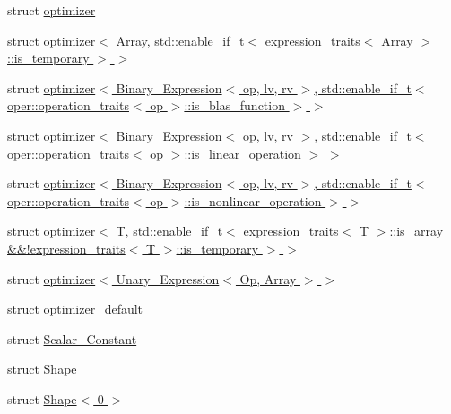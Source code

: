 \begin{DoxyCompactItemize}
\item 
struct \hyperlink{structBC_1_1tensors_1_1exprs_1_1optimizer}{optimizer}
\item 
struct \hyperlink{structBC_1_1tensors_1_1exprs_1_1optimizer_3_01Array_00_01std_1_1enable__if__t_3_01expression__tr68cef5038e1d1eb9ba9ce04475b4c24a}{optimizer$<$ Array, std\+::enable\+\_\+if\+\_\+t$<$ expression\+\_\+traits$<$ Array $>$\+::is\+\_\+temporary $>$ $>$}
\item 
struct \hyperlink{structBC_1_1tensors_1_1exprs_1_1optimizer_3_01Binary__Expression_3_01op_00_01lv_00_01rv_01_4_00_183e68db6823926ca0c2e82552c93f0f}{optimizer$<$ Binary\+\_\+\+Expression$<$ op, lv, rv $>$, std\+::enable\+\_\+if\+\_\+t$<$ oper\+::operation\+\_\+traits$<$ op $>$\+::is\+\_\+blas\+\_\+function $>$ $>$}
\item 
struct \hyperlink{structBC_1_1tensors_1_1exprs_1_1optimizer_3_01Binary__Expression_3_01op_00_01lv_00_01rv_01_4_00_f6303e0a787eb8566b71e5cc034a3dd8}{optimizer$<$ Binary\+\_\+\+Expression$<$ op, lv, rv $>$, std\+::enable\+\_\+if\+\_\+t$<$ oper\+::operation\+\_\+traits$<$ op $>$\+::is\+\_\+linear\+\_\+operation $>$ $>$}
\item 
struct \hyperlink{structBC_1_1tensors_1_1exprs_1_1optimizer_3_01Binary__Expression_3_01op_00_01lv_00_01rv_01_4_00_11116ffe640829700a69ab4f1bad216e}{optimizer$<$ Binary\+\_\+\+Expression$<$ op, lv, rv $>$, std\+::enable\+\_\+if\+\_\+t$<$ oper\+::operation\+\_\+traits$<$ op $>$\+::is\+\_\+nonlinear\+\_\+operation $>$ $>$}
\item 
struct \hyperlink{structBC_1_1tensors_1_1exprs_1_1optimizer_3_01T_00_01std_1_1enable__if__t_3_01expression__traitsf1cfe5fcb8a0bc73842726d99ded0fc2}{optimizer$<$ T, std\+::enable\+\_\+if\+\_\+t$<$ expression\+\_\+traits$<$ T $>$\+::is\+\_\+array \&\&!expression\+\_\+traits$<$ T $>$\+::is\+\_\+temporary $>$ $>$}
\item 
struct \hyperlink{structBC_1_1tensors_1_1exprs_1_1optimizer_3_01Unary__Expression_3_01Op_00_01Array_01_4_01_4}{optimizer$<$ Unary\+\_\+\+Expression$<$ Op, Array $>$ $>$}
\item 
struct \hyperlink{structBC_1_1tensors_1_1exprs_1_1optimizer__default}{optimizer\+\_\+default}
\item 
struct \hyperlink{structBC_1_1tensors_1_1exprs_1_1Scalar__Constant}{Scalar\+\_\+\+Constant}
\item 
struct \hyperlink{classBC_1_1tensors_1_1exprs_1_1Shape}{Shape}
\item 
struct \hyperlink{structBC_1_1tensors_1_1exprs_1_1Shape_3_010_01_4}{Shape$<$ 0 $>$}

\end{DoxyCompactItemize}
